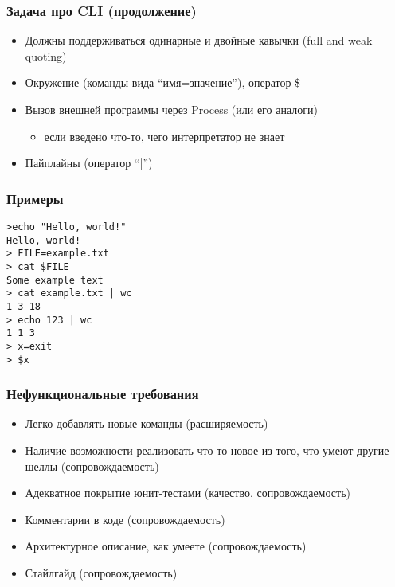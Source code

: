 \documentclass[xetex,mathserif,serif]{beamer}
\begin{document}
	\begin{frame}
		\frametitle{Задача про CLI (продолжение)}
		\begin{itemize}
			\item Должны поддерживаться одинарные и двойные кавычки (full and weak quoting)
			\item Окружение (команды вида ``имя=значение''), оператор \$
			\item Вызов внешней программы через Process (или его аналоги)
			\begin{itemize}
				\item если введено что-то, чего интерпретатор не знает
			\end{itemize}
			\item Пайплайны (оператор ``|'')
		\end{itemize}
	\end{frame}
	
	\begin{frame}[fragile]
		\frametitle{Примеры}
\begin{verbatim}
>echo "Hello, world!"
Hello, world!
> FILE=example.txt
> cat $FILE
Some example text
> cat example.txt | wc
1 3 18
> echo 123 | wc
1 1 3
> x=exit
> $x
\end{verbatim}
\end{frame}

	\begin{frame}
		\frametitle{Нефункциональные требования}
		\begin{itemize}
			\item Легко добавлять новые команды (расширяемость)
			\item Наличие возможности реализовать что-то новое из того, что умеют другие шеллы (сопровождаемость)
			\item Адекватное покрытие юнит-тестами (качество, сопровождаемость)
			\item Комментарии в коде (сопровождаемость)
			\item Архитектурное описание, как умеете (сопровождаемость)
			\item Стайлгайд (сопровождаемость)
		\end{itemize}
	\end{frame}
	
\end{document}
